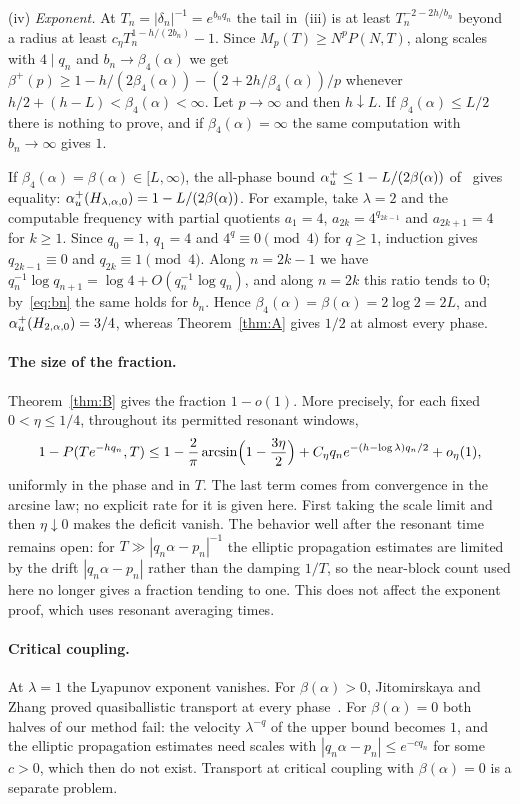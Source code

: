 \begin{remark}
(iv) \emph{Exponent.} At $T_n=|\delta_n|^{-1}=e^{b_nq_n}$ the tail in~(iii) is at least $T_n^{-2-2h/b_n}$ beyond a radius at least $c_\eta T_n^{1-h/(2b_n)}-1$. Since $M_p(T)\ge N^pP(N,T)$, along scales with $4\mid q_n$ and $b_n\to\beta_4(\alpha)$ we get $\beta^+(p)\ge1-h/(2\beta_4(\alpha))-(2+2h/\beta_4(\alpha))/p$ whenever $h/2+(h-L)<\beta_4(\alpha)<\infty$. Let $p\to\infty$ and then $h\downarrow L$. If $\beta_4(\alpha)\le L/2$ there is nothing to prove, and if $\beta_4(\alpha)=\infty$ the same computation with $b_n\to\infty$ gives $1$.

If $\beta_4(\alpha)=\beta(\alpha)\in[L,\infty)$, the all-phase bound $\alpha_u^+\le1-L/(2\beta(\alpha))$ of~\cite[Theorem~A and Corollary~5.6]{DMworstcase} gives equality: $\alpha_u^+(H_{\lambda,\alpha,0})=1-L/(2\beta(\alpha))$. For example, take $\lambda=2$ and the computable frequency with partial quotients $a_1=4$, $a_{2k}=4^{q_{2k-1}}$ and $a_{2k+1}=4$ for $k\ge1$. Since $q_0=1$, $q_1=4$ and $4^{q}\equiv0\pmod4$ for $q\ge1$, induction gives $q_{2k-1}\equiv0$ and $q_{2k}\equiv1\pmod4$. Along $n=2k-1$ we have $q_n^{-1}\log q_{n+1}=\log4+O(q_n^{-1}\log q_n)$, and along $n=2k$ this ratio tends to $0$; by~\eqref{eq:bn} the same holds for $b_n$. Hence $\beta_4(\alpha)=\beta(\alpha)=2\log2=2L$, and $\alpha_u^+(H_{2,\alpha,0})=3/4$, whereas Theorem~\ref{thm:A} gives $1/2$ at almost every phase.
\end{remark}

\paragraph{The size of the fraction.}
Theorem~\ref{thm:B} gives the fraction $1-o(1)$. More precisely, for each fixed $0<\eta\le1/4$, throughout its permitted resonant windows,
\[
1-P(Te^{-hq_n},T)
\le 1-\frac2\pi\arcsin\Bigl(1-\frac{3\eta}2\Bigr)
 +C_\eta q_ne^{-(h-\log\lambda)q_n/2}+o_\eta(1),
\]
uniformly in the phase and in $T$. The last term comes from convergence in the arcsine law; no explicit rate for it is given here. First taking the scale limit and then $\eta\downarrow0$ makes the deficit vanish. The behavior well after the resonant time remains open: for $T\gg|q_n\alpha-p_n|^{-1}$ the elliptic propagation estimates are limited by the drift $|q_n\alpha-p_n|$ rather than the damping $1/T$, so the near-block count used here no longer gives a fraction tending to one. This does not affect the exponent proof, which uses resonant averaging times.

\paragraph{Critical coupling.} At $\lambda=1$ the Lyapunov exponent vanishes. For $\beta(\alpha)>0$, Jitomirskaya and Zhang proved quasiballistic transport at every phase~\cite[Corollary~3]{JZ2022}. For $\beta(\alpha)=0$ both halves of our method fail: the velocity $\lambda^{-q}$ of the upper bound becomes $1$, and the elliptic propagation estimates need scales with $|q_n\alpha-p_n|\le e^{-cq_n}$ for some $c>0$, which then do not exist. Transport at critical coupling with $\beta(\alpha)=0$ is a separate problem.

